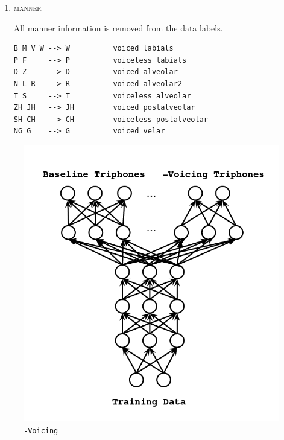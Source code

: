 \documentclass[10pt,a4paper]{article}
\begin{document}
\begin{enumerate}
\begin{enumerate}
  \item \textsc{manner}
    
    All manner information is removed from the data labels.

\begin{verbatim}
B M V W --> W          voiced labials
P F     --> P          voiceless labials
D Z     --> D          voiced alveolar
N L R   --> R          voiced alveolar2
T S     --> T          voiceless alveolar
ZH JH   --> JH         voiced postalveolar
SH CH   --> CH         voiceless postalveolar
NG G    --> G          voiced velar
\end{verbatim}

  \end{enumerate}


\begin{figure}[!htb]
  \includegraphics[width=\linewidth]{figs/mtl-arch-voicing.png}
  \caption{\texttt{-Voicing}}
\endminipage\hfill
{}

\end{figure}
\end{enumerate}
\end{document}
